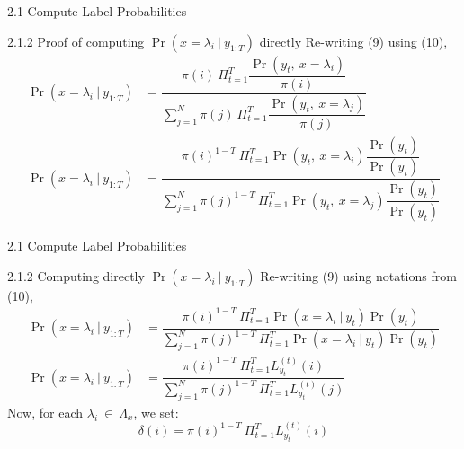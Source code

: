 \documentclass{beamer}
\providecommand{\pr}[1]{\ensuremath{\Pr\left(#1\right)}}
\begin{document}
\begin{frame}{2.1 Compute Label Probabilities}
\begin{block}{2.1.2 Proof of computing $\pr{x = \lambda_i\ |\ y_{1:T}}$ directly}
    Re-writing (9) using (10),
    \begin{equation}
        \begin{split}
            \pr{x=\lambda_i\ |\ y_{1:T}} &= \dfrac{\pi(i)\ \Pi_{t=1}^{T}\dfrac{\pr{y_t,\ x=\lambda_i}}{\pi(i)}}{\sum_{j=1}^{N}\pi(j)\ \Pi_{t=1}^{T}\dfrac{\pr{y_t,\ x=\lambda_j}}{\pi(j)}}\\
            \pr{x=\lambda_i\ |\ y_{1:T}} &= \dfrac{\pi(i)^{1-T}\ \Pi_{t=1}^{T}\pr{y_t,\ x=\lambda_i}\dfrac{\pr{y_t}}{\pr{y_t}}}{\sum_{j=1}^{N}\pi(j)^{1-T}\ \Pi_{t=1}^{T}\pr{y_t,\ x=\lambda_j}\dfrac{\pr{y_t}}{\pr{y_t}}}
        \end{split}
    \end{equation}
\end{block}
\end{frame}
\begin{frame}{2.1 Compute Label Probabilities}
\begin{block}{2.1.2 Computing directly $\pr{x = \lambda_i\ |\ y_{1:T}}$}
    Re-writing (9) using notations from (10),
    \begin{equation}
        \begin{split}
            \pr{x=\lambda_i\ |\ y_{1:T}} &= \dfrac{\pi(i)^{1-T}\ \Pi_{t=1}^{T}\pr{x = \lambda_i\ |\ y_t}\pr{y_t}}{\sum_{j=1}^{N}\pi(j)^{1-T}\ \Pi_{t=1}^{T}\pr{x = \lambda_i\ |\ y_t}\pr{y_t}}\\
            \pr{x=\lambda_i\ |\ y_{1:T}} &= \dfrac{\pi(i)^{1-T}\ \Pi_{t=1}^{T}L_{y_t}^{(t)}(i)}{\sum_{j=1}^{N}\pi(j)^{1-T}\ \Pi_{t=1}^{T}L_{y_t}^{(t)}(j)}
        \end{split}
    \end{equation}
    Now, for each $\lambda_i\ \in\ \Lambda_x$, we set:
    \begin{equation}
        \delta(i) = \pi(i)^{1-T}\ \Pi_{t=1}^{T}L_{y_t}^{(t)}(i)
    \end{equation}
\end{block}
\end{frame}
\end{document}
